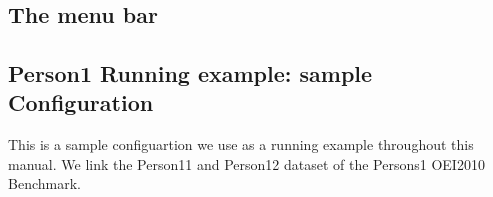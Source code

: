 \documentclass[oneside,a4paper,12pt]{memoir}
\begin{document}



\newpage
\appendix
\chapter{}
\section{The menu bar}
\label{menuBar}


\section{Person1 Running example: sample Configuration}
\label{person1Spec}
This is a sample configuartion we use as a running example throughout this manual. We link the Person11 and Person12 dataset of the Persons1 OEI2010 Benchmark.\\
\lstset{language=XML}

\end{document}
